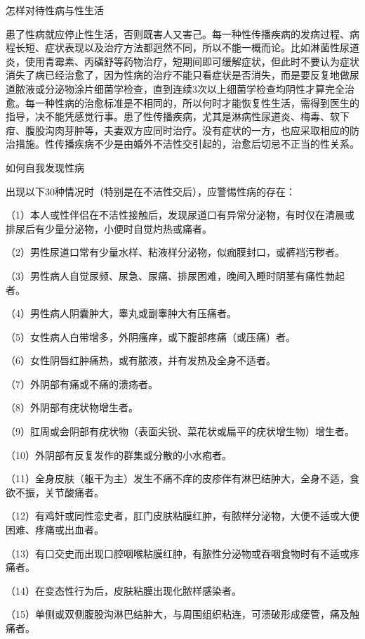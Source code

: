 \documentclass[12pt,UTF8]{ctexbook}
\begin{document}
怎样对待性病与性生活


患了性病就应停止性生活，否则既害人又害己。每一种性传播疾病的发病过程、病程长短、症状表现以及治疗方法都迥然不同，所以不能一概而论。比如淋菌性尿道炎，使用青霉素、丙磺舒等药物治疗，短期间即可缓解症状，但此时不要认为症状消失了病已经治愈了，因为性病的治疗不能只看症状是否消失，而是要反复地做尿道脓液或分泌物涂片细菌学检查，直到连续3次以上细菌学检查均阴性才算完全治愈。每一种性病的治愈标准是不相同的，所以何时才能恢复性生活，需得到医生的指导，决不能凭感觉行事。患了性传播疾病，尤其是淋病性尿道炎、梅毒、软下疳、腹股沟肉芽肿等，夫妻双方应同时治疗。没有症状的一方，也应采取相应的防治措施。性传播疾病不少是由婚外不洁性交引起的，治愈后切忌不正当的性关系。





如何自我发现性病


出现以下30种情况时（特别是在不洁性交后），应警惕性病的存在：

（1）本人或性伴侣在不洁性接触后，发现尿道口有异常分泌物，有时仅在清晨或排尿后有少量分泌物，小便时自觉灼热或痛者。

（2）男性尿道口常有少量水样、粘液样分泌物，似痂膜封口，或裤裆污秽者。

（3）男性病人自觉尿频、尿急、尿痛、排尿困难，晚间入睡时阴茎有痛性勃起者。

（4）男性病人阴囊肿大，睾丸或副睾肿大有压痛者。

（5）女性病人白带增多，外阴瘙痒，或下腹部疼痛（或压痛）者。

（6）女性阴唇红肿痛热，或有脓液，并有发热及全身不适者。

（7）外阴部有痛或不痛的溃疡者。

（8）外阴部有疣状物增生者。

（9）肛周或会阴部有疣状物（表面尖锐、菜花状或扁平的疣状增生物）增生者。

（10）外阴部有反复发作的群集或分散的小水疱者。

（11）全身皮肤（躯干为主）发生不痛不痒的皮疹伴有淋巴结肿大，全身不适，食欲不振，关节酸痛者。

（12）有鸡奸或同性恋史者，肛门皮肤粘膜红肿，有脓样分泌物，大便不适或大便困难、疼痛或出血者。

（13）有口交史而出现口腔咽喉粘膜红肿，有脓性分泌物或吞咽食物时有不适或疼痛者。

（14）在变态性行为后，皮肤粘膜出现化脓样感染者。

（15）单侧或双侧腹股沟淋巴结肿大，与周围组织粘连，可溃破形成瘘管，痛及触痛者。
\end{document}
